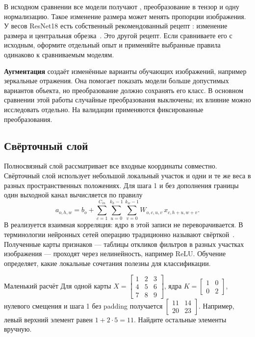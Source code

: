 В исходном сравнении все модели получают , преобразование в тензор и одну нормализацию. Такое изменение размера может менять пропорции изображения. У весов ResNet18 есть собственный рекомендованный рецепт : изменение размера и центральная обрезка~\cite{resnet18}. Это другой рецепт. Если сравниваете его с исходным, оформите отдельный опыт и применяйте выбранные правила одинаково к сравниваемым моделям.

\textbf{Аугментация} создаёт изменённые варианты обучающих изображений, например зеркальные отражения. Она помогает показать модели больше допустимых вариантов объекта, но преобразование должно сохранять его класс. В основном сравнении этой работы случайные преобразования выключены; их влияние можно исследовать отдельно. На валидации применяются фиксированные преобразования.

\subsection{Свёрточный слой}
Полносвязный слой рассматривает все входные координаты совместно. Свёрточный слой использует небольшой локальный участок и одни и те же веса в разных пространственных положениях. Для шага 1 и без дополнения границы один выходной канал вычисляется по правилу
\begin{equation}
a_{o,h,w}=b_o+\sum_{c=1}^{C_{in}}\sum_{u=0}^{k_h-1}\sum_{v=0}^{k_w-1}
W_{o,c,u,v}\,x_{c,h+u,w+v}.
\end{equation}
В  реализуется взаимная корреляция: ядро в этой записи не переворачивается. В терминологии нейронных сетей операцию традиционно называют свёрткой~\cite{conv2d}. Полученные карты признаков --- таблицы откликов фильтров в разных участках изображения --- проходят через нелинейность, например ReLU. Обучение определяет, какие локальные сочетания полезны для классификации.

\begin{keybox}{Маленький расчёт}
Для одной карты \(X=\left[\begin{smallmatrix}1&2&3\\4&5&6\\7&8&9\end{smallmatrix}\right]\), ядра \(K=\left[\begin{smallmatrix}1&0\\0&2\end{smallmatrix}\right]\), нулевого смещения и шага 1 без padding получается \(\left[\begin{smallmatrix}11&14\\20&23\end{smallmatrix}\right]\). Например, левый верхний элемент равен \(1+2\cdot5=11\). Найдите остальные элементы вручную.
\end{keybox}

